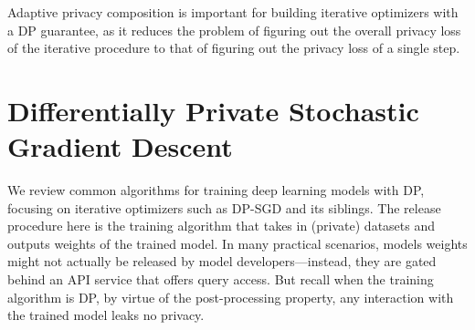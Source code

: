 Adaptive privacy composition is important for building iterative optimizers with a DP guarantee, as it reduces the problem of figuring out the overall privacy loss of the iterative procedure to that of figuring out the privacy loss of a single step.

\section[Differentially Private Stochastic Gradient Descent]{\large Differentially Private Stochastic Gradient Descent}
We review common algorithms for training deep learning models with DP, focusing on iterative optimizers such as DP-SGD and its siblings.
The release procedure here is the training algorithm that takes in (private) datasets and outputs weights of the trained model.
In many practical scenarios, models weights might not actually be released by model developers---instead, they are gated behind an API service that offers query access.
But recall when the training algorithm is DP, by virtue of the post-processing property, any interaction with the trained model leaks no privacy.

